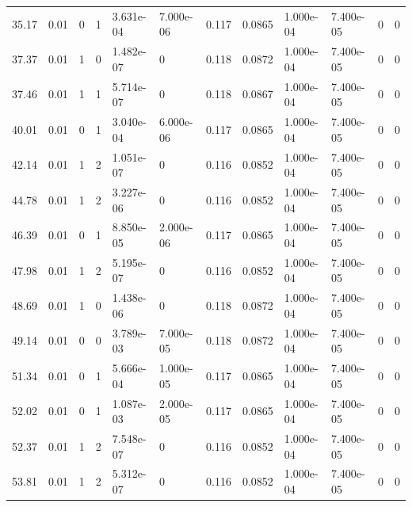 \documentclass[preview]{standalone}
\begin{document}
{{\begin{tabular}{L{1.2cm}C{1.2cm} C{0.3cm}C{0.5cm} C{1.4cm}C{1.4cm} C{1.4cm}C{1.4cm} C{1.6cm}C{1.6cm} C{1.6cm}C{1.6cm}}
  35.17  &  0.01  & 0     &  1 &  3.631e-04  & 7.000e-06  &  0.117&   0.0865& 1.000e-04 & 7.400e-05   &  0 & 0  \\ 
  37.37  &  0.01  & 1     &  0 &  1.482e-07  & 0  &  0.118&   0.0872& 1.000e-04 & 7.400e-05   &  0 & 0  \\ 
  37.46  &  0.01  & 1     &  1 &  5.714e-07  & 0  &  0.118&   0.0867& 1.000e-04 & 7.400e-05   &  0 & 0  \\ 
  40.01  &  0.01  & 0     &  1 &  3.040e-04  & 6.000e-06  &  0.117&   0.0865& 1.000e-04 & 7.400e-05   &  0 & 0  \\ 
  42.14  &  0.01  & 1     &  2 &  1.051e-07  & 0  &  0.116&   0.0852& 1.000e-04 & 7.400e-05   &  0 & 0  \\ 
  44.78  &  0.01  & 1     &  2 &  3.227e-06  & 0  &  0.116&   0.0852& 1.000e-04 & 7.400e-05   &  0 & 0  \\ 
  46.39  &  0.01  & 0     &  1 &  8.850e-05  & 2.000e-06  &  0.117&   0.0865& 1.000e-04 & 7.400e-05   &  0 & 0  \\ 
  47.98  &  0.01  & 1     &  2 &  5.195e-07  & 0  &  0.116&   0.0852& 1.000e-04 & 7.400e-05   &  0 & 0  \\ 
  48.69  &  0.01  & 1     &  0 &  1.438e-06  & 0  &  0.118&   0.0872& 1.000e-04 & 7.400e-05   &  0 & 0  \\ 
  49.14  &  0.01  & 0     &  0 &  3.789e-03  & 7.000e-05  &  0.118&   0.0872& 1.000e-04 & 7.400e-05   &  0 & 0  \\ 
  51.34  &  0.01  & 0     &  1 &  5.666e-04  & 1.000e-05  &  0.117&   0.0865& 1.000e-04 & 7.400e-05   &  0 & 0  \\ 
  52.02  &  0.01  & 0     &  1 &  1.087e-03  & 2.000e-05  &  0.117&   0.0865& 1.000e-04 & 7.400e-05   &  0 & 0  \\ 
  52.37  &  0.01  & 1     &  2 &  7.548e-07  & 0  &  0.116&   0.0852& 1.000e-04 & 7.400e-05   &  0 & 0  \\ 
  53.81  &  0.01  & 1     &  2 &  5.312e-07  & 0  &  0.116&   0.0852& 1.000e-04 & 7.400e-05   &  0 & 0  \\ 
\hline 
\end{tabular} 

}}
\end{document}
